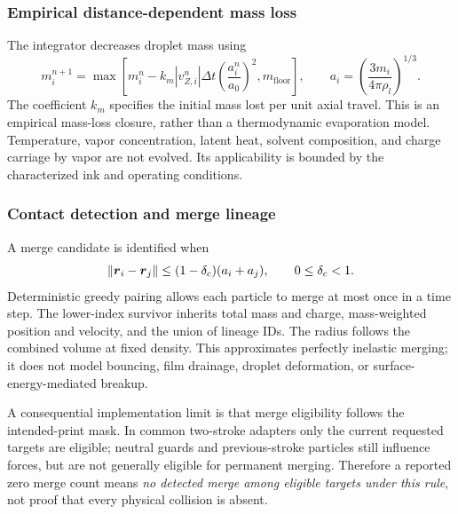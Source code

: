 \subsubsection{Empirical distance-dependent mass loss}
The integrator decreases droplet mass using
\begin{equation}
 m_i^{n+1}=\max\left[m_i^n-k_m|v_{Z,i}^n|\Delta t
                   \left(\frac{a_i^n}{a_0}\right)^2,m_{\mathrm{floor}}\right],
 \qquad a_i=\left(\frac{3m_i}{4\pi\rho_l}\right)^{1/3}.
\end{equation}
The coefficient $k_m$ specifies the initial mass lost per unit axial travel. This is an empirical mass-loss closure, rather than a thermodynamic evaporation model. Temperature, vapor concentration, latent heat, solvent composition, and charge carriage by vapor are not evolved. Its applicability is bounded by the characterized ink and operating conditions.

\subsubsection{Contact detection and merge lineage}
A merge candidate is identified when
\begin{equation}
 \|\boldsymbol{r}_i-\boldsymbol{r}_j\|\leq(1-\delta_c)(a_i+a_j),\qquad 0\leq\delta_c<1.
\end{equation}
Deterministic greedy pairing allows each particle to merge at most once in a time step. The lower-index survivor inherits total mass and charge, mass-weighted position and velocity, and the union of lineage IDs. The radius follows the combined volume at fixed density. This approximates perfectly inelastic merging; it does not model bouncing, film drainage, droplet deformation, or surface-energy-mediated breakup.

A consequential implementation limit is that merge eligibility follows the intended-print mask. In common two-stroke adapters only the current requested targets are eligible; neutral guards and previous-stroke particles still influence forces, but are not generally eligible for permanent merging. Therefore a reported zero merge count means \emph{no detected merge among eligible targets under this rule}, not proof that every physical collision is absent.
